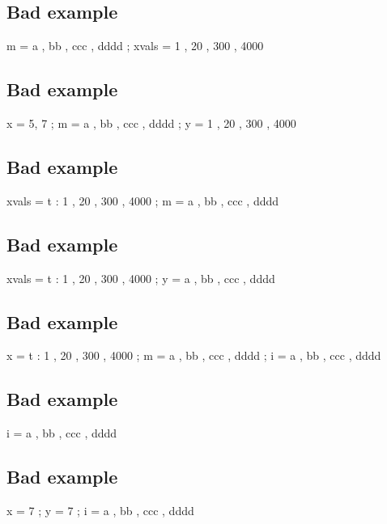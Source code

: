 \documentclass[12pt]{article}
\begin{document}
\subsection{Bad example \thesubsection}

\begin{functable}
    m     = a , bb , ccc , dddd ;
    xvals = 1 , 20 , 300 , 4000 
\end{functable}


\subsection{Bad example \thesubsection}

\begin{functable}
    x = 5, 7 ;
    m = a , bb , ccc , dddd ;
    y = 1 , 20 , 300 , 4000 
\end{functable}


\subsection{Bad example \thesubsection}

\begin{functable}
    xvals = t : 1 , 20 , 300 , 4000 ;
    m     = a , bb , ccc , dddd 
\end{functable}


\subsection{Bad example \thesubsection}

\begin{functable}
    xvals = t : 1 , 20 , 300 , 4000 ;
    y     = a , bb , ccc , dddd 
\end{functable}


\subsection{Bad example \thesubsection}

\begin{functable}
    x = t : 1 , 20 , 300 , 4000 ;
    m = a , bb , ccc , dddd ;
    i = a , bb , ccc , dddd 
\end{functable}


\subsection{Bad example \thesubsection}

\begin{functable}
    i = a , bb , ccc , dddd 
\end{functable}


\subsection{Bad example \thesubsection}

\begin{functable}
    x = 7 ;
    y = 7 ;
    i = a , bb , ccc , dddd 
\end{functable}
\end{document}
